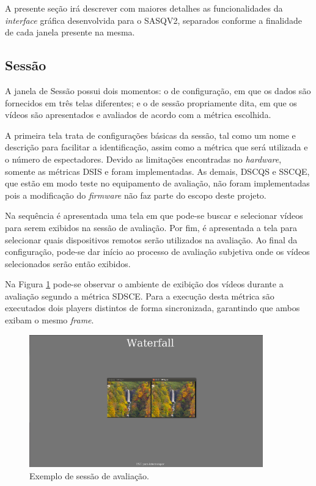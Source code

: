 A presente seção irá descrever com maiores detalhes as funcionalidades da \emph{interface} gráfica desenvolvida para o SASQV2, separados conforme a finalidade de cada janela presente na mesma.

\subsection{Sessão}

A janela de Sessão possui dois momentos: o de configuração, em que os dados são fornecidos em três telas diferentes; e o de sessão propriamente dita, em que os vídeos são apresentados e avaliados de acordo com a métrica escolhida.

A primeira tela trata de configurações básicas da sessão, tal como um nome e descrição para facilitar a identificação, assim como a métrica que será utilizada e o número de espectadores. Devido as limitações encontradas no \emph{hardware}, somente as métricas DSIS e  foram implementadas. As demais, DSCQS e SSCQE, que estão em modo teste no equipamento de avaliação, não foram implementadas pois a modificação do \emph{firmware} não faz parte do escopo deste projeto.

Na sequência é apresentada uma tela em que pode-se buscar e selecionar vídeos para serem exibidos na sessão de avaliação. Por fim, é apresentada a tela para selecionar quais dispositivos remotos serão utilizados na avaliação. Ao final da configuração, pode-se dar início ao processo de avaliação subjetiva onde os vídeos selecionados serão então exibidos.

Na Figura \ref{fig:sessao} pode-se observar o ambiente de exibição dos vídeos durante a avaliação segundo a métrica SDSCE.
Para a execução desta métrica são executados dois players distintos de forma sincronizada, garantindo que ambos exibam o mesmo \emph{frame}.

\begin{figure}[!htb]
	\centering
	\includegraphics[width=0.9\textwidth]{./imgs/sessao.png}
	\caption{Exemplo de sessão de avaliação.}
	\label{fig:sessao}
\end{figure}

